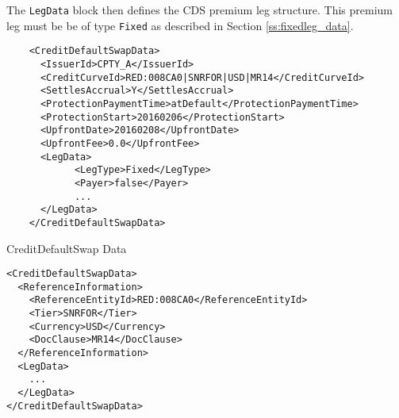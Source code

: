 The \lstinline!LegData! block then defines the CDS premium leg structure. This premium leg must be be of type \lstinline!Fixed! as described in Section \ref{ss:fixedleg_data}.

\begin{listing}[H]
\begin{verbatim}
    <CreditDefaultSwapData>
      <IssuerId>CPTY_A</IssuerId>
      <CreditCurveId>RED:008CA0|SNRFOR|USD|MR14</CreditCurveId>
      <SettlesAccrual>Y</SettlesAccrual>
      <ProtectionPaymentTime>atDefault</ProtectionPaymentTime>
      <ProtectionStart>20160206</ProtectionStart>
      <UpfrontDate>20160208</UpfrontDate>
      <UpfrontFee>0.0</UpfrontFee>
      <LegData>
            <LegType>Fixed</LegType>
            <Payer>false</Payer>
            ...
      </LegData>
    </CreditDefaultSwapData>
\end{verbatim}
\caption{CreditDefaultSwap Data}
\label{lst:cdsdata}
\end{listing}

\begin{listing}[H]
\begin{verbatim}
<CreditDefaultSwapData>
  <ReferenceInformation>
    <ReferenceEntityId>RED:008CA0</ReferenceEntityId>
    <Tier>SNRFOR</Tier>
    <Currency>USD</Currency>
    <DocClause>MR14</DocClause>
  </ReferenceInformation>
  <LegData>
    ...
  </LegData>
</CreditDefaultSwapData>
\end{verbatim}
\caption{\lstinline!CreditDefaultSwapData! with \lstinline!ReferenceInformation!}
\label{lst:cdsdata_with_ref_info}
\end{listing}
